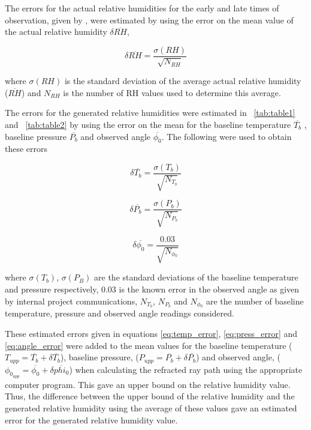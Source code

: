 \documentclass[11pt]{article}
\newcommand{\tabref}[2][\tablename~]{#1\ref{#2}}
\begin{document}
\vspace{15mm}
\noindent
The errors for the actual relative humidities for the early and late times of observation, given by \cite{Web01}, were estimated by using the error on the mean value of the actual relative humidity $\delta{\overline{RH}}$,


\begin{equation}
\label{eq:RH_error}
\delta{\overline{RH}} = \frac{\sigma{(RH)}}{\sqrt{N_{RH}}}
\end{equation}

\vspace{2mm}
\noindent
where $\sigma{(RH)}$ is the standard deviation of the average actual relative humidity ($\overline{RH}$) and $N_{RH}$ is the number of RH values used to determine this average.

\vspace{2mm}
\noindent
The errors for the generated relative humidities were estimated in \tabref{tab:table1} and \tabref{tab:table2} by using the error on the mean for the baseline temperature $\overline{T_b}$ \cite{Web01}, baseline pressure $\overline{P_b}$ \cite{Web01} and observed angle $\overline{\phi_0}$. The following were used to obtain these errors

\begin{equation}
\label{eq:temp_error}
\delta{\overline{T_b}} = \frac{\sigma{(T_b)}}{\sqrt{N_{T{_b}}}}
\end{equation}


\begin{equation}
\label{eq:press_error}
\delta{\overline{P_b}} = \frac{\sigma{(P_b)}}{\sqrt{N_{P{_b}}}}
\end{equation}

\begin{equation}
\label{eq:angle_error}
\delta{\overline{\phi_0}} = \frac{0.03}{\sqrt{N_{\phi{_0}}}}
\end{equation}

\vspace{2mm}
\noindent
where $\sigma{(T_b)}$, $\sigma{(P_B)}$ are the standard deviations of the baseline temperature and pressure respectively, 0.03 is the known error in the observed angle as given by internal project communications, $N_{T{_b}}$, $N_{P{_b}}$ and $N_{\phi{_0}}$ are the number of baseline temperature, pressure and observed angle readings considered. 

\vspace{2mm}
\noindent
These estimated errors given in equations \eqref{eq:temp_error}, \eqref{eq:press_error} and \eqref{eq:angle_error} were added to the mean values for the baseline temperature ($T_{upp} = \overline{T_b} + \delta{\overline{T_b}}$), baseline pressure, ($P_{upp} = \overline{P_b} + \delta{\overline{P_b}}$) and observed angle, ($\phi_{0_{upp}} = \overline{\phi_0} + \delta{\overline{phi_0}}$) when calculating the refracted ray path using the appropriate computer program. This gave an upper bound on the relative humidity value. Thus, the difference between the upper bound of the relative humidity and the generated relative humidity using the average of these values gave an estimated error for the generated relative humidity value.
\end{document}
